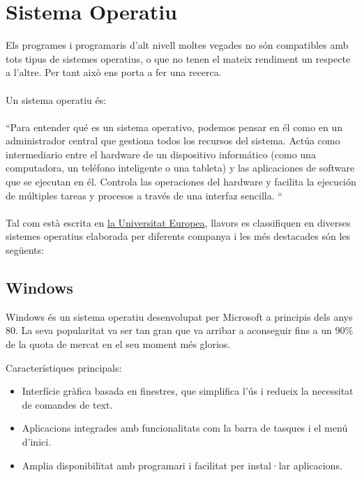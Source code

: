 \section{Sistema Operatiu}
Els programes i programaris d'alt nivell moltes vegades no són compatibles amb tots tipus de sistemes operatius, o que no tenen el mateix rendiment un respecte a l'altre. Per tant això ens porta a fer una recerca.\\ \\
Un sistema operatiu és:\\ \\
{\color{gray}``Para entender qué es un sistema operativo, podemos pensar en él como en un administrador central que gestiona todos los recursos del sistema. Actúa como intermediario entre el hardware de un dispositivo informático (como una computadora, un teléfono inteligente o una tableta) y las aplicaciones de software que se ejecutan en él. Controla las operaciones del hardware y facilita la ejecución de múltiples tareas y procesos a través de una interfaz sencilla. ``}\\ \\
 Tal com està escrita en \href{https://universidadeuropea.com/blog/que-es-sistema-operativo/}{la Universitat Europea}, llavors es classifiquen en diverses sistemes operatius elaborada per diferents companya i les més destacades són les següents:   

\subsection{Windows}

\label{subsec:Microsoft Windows}
Windows és un sistema operatiu desenvolupat per Microsoft a principis dels anys 80. La seva popularitat va ser tan gran que va arribar a aconseguir fins a un 90\% de la quota de mercat en el seu moment més glorios.

Característiques principals:
\begin{itemize}
 \item Interfície gràfica basada en finestres, que simplifica l'ús i redueix la necessitat de comandes de text.
 \item Aplicacions integrades amb funcionalitats com la barra de tasques i el menú d'inici.
 \item Amplia disponibilitat amb programari i facilitat per instal·lar aplicacions.
\end{itemize}

